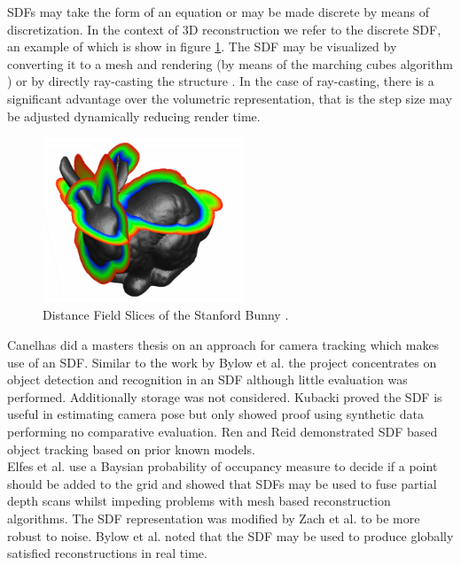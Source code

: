SDFs may take the form of an equation or may be made discrete by means of discretization. In the context of 3D reconstruction we refer to the discrete SDF, an example of which is show in figure \ref{fig:SDFExample}. The SDF may be visualized by converting it to a mesh and rendering (by means of the marching cubes algorithm \cite{Cubes87High}) or by directly ray-casting the structure \cite{Parker98Interactive}. In the case of ray-casting, there is a significant advantage over the volumetric representation, that is the step size may be adjusted dynamically reducing render time. \\


\begin{figure}[!htb]
\centering
\includegraphics[width=6cm]{images/literature/SDFExample}
\caption{Distance Field Slices of the Stanford Bunny \cite{Sigg03Signed}.}
\label{fig:SDFExample}
\end{figure}

Canelhas \cite{Canelhas12Scene} did a masters thesis on an approach for camera tracking which makes use of an SDF. Similar to the work by Bylow et al. \cite{Bylow13Real} the project concentrates on object detection and recognition in an SDF although little evaluation was performed. Additionally storage was not considered. Kubacki \cite{Kubacki12Registration} proved the SDF is useful in estimating camera pose but only showed proof using synthetic data performing no comparative evaluation. Ren and Reid \cite{Ren12Unified}  demonstrated SDF based object tracking based on prior known models. \\

Elfes et al. \cite{Elfes87Sensor} use a Baysian probability of occupancy measure to decide if a point should be added to the grid and showed that SDFs may be used to fuse partial depth scans whilst impeding problems with mesh based reconstruction algorithms. The SDF representation was modified by Zach et al. \cite{Zach07Globally} to be more robust to noise. Bylow et al. noted that the SDF may be used to produce globally satisfied reconstructions in real time. \\


